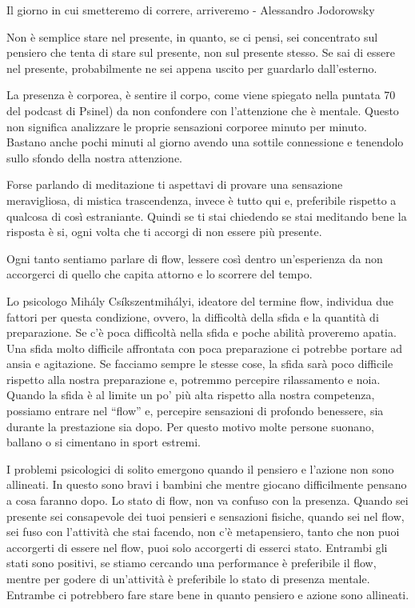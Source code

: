 \documentclass[12pt]{book} %
\begin{document}
Il giorno in cui smetteremo di correre, arriveremo - Alessandro Jodorowsky

Non è semplice stare nel presente, in quanto, se ci pensi, sei concentrato sul pensiero che tenta di stare sul presente, non sul presente stesso. Se sai di essere nel presente, probabilmente ne sei appena uscito per guardarlo dall'esterno.

La presenza è corporea, è sentire il corpo, come viene spiegato nella puntata
70 del podcast di Psinel) da non confondere con l'attenzione che è mentale. Questo non significa analizzare le proprie sensazioni corporee minuto
per minuto. Bastano anche pochi minuti al giorno avendo una sottile connessione e tenendolo sullo sfondo della nostra attenzione.

Forse parlando di meditazione ti aspettavi di provare una sensazione meravigliosa, di mistica trascendenza, invece è
tutto qui e, preferibile rispetto a qualcosa di così estraniante. Quindi se ti stai chiedendo se stai meditando bene la
risposta è si, ogni volta che ti accorgi di non essere più presente.

Ogni tanto sentiamo parlare di flow, lessere così dentro un'esperienza da non accorgerci di quello che capita attorno e lo scorrere del tempo.

Lo psicologo Mihály Csíkszentmihályi, ideatore del termine flow, individua due fattori per questa condizione, ovvero, la difficoltà della sfida e la quantità di preparazione. Se c'è poca difficoltà nella sfida e poche abilità proveremo apatia. Una sfida molto difficile affrontata con poca preparazione ci potrebbe portare ad ansia e agitazione. Se facciamo sempre le stesse cose, la sfida sarà poco difficile rispetto alla nostra preparazione e, potremmo percepire rilassamento e noia. Quando la sfida è al limite un po' più alta rispetto alla nostra competenza, possiamo entrare nel “flow” e, percepire sensazioni di profondo benessere, sia durante la prestazione sia dopo. Per questo motivo molte persone suonano, ballano o si cimentano in sport estremi.

I problemi psicologici di solito emergono quando il pensiero e l'azione non sono allineati. In questo sono bravi i bambini che mentre giocano difficilmente pensano a cosa faranno dopo. Lo stato di flow, non va confuso con la presenza. Quando sei presente sei consapevole dei tuoi pensieri e sensazioni fisiche, quando sei nel flow, sei fuso con l'attività che stai facendo, non c'è metapensiero, tanto che non puoi accorgerti di essere nel flow, puoi solo accorgerti di esserci stato. Entrambi gli stati sono positivi, se stiamo cercando una performance è preferibile il flow, mentre per godere di un'attività è preferibile lo stato di presenza mentale. Entrambe ci potrebbero fare stare bene in quanto pensiero e azione sono allineati.
\end{document}
